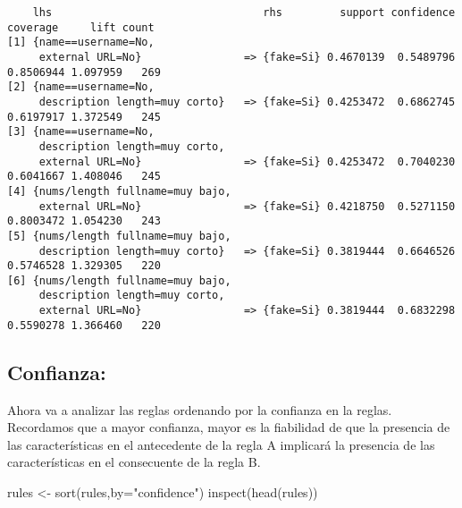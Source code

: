 \documentclass[
  letterpaper,
  DIV=11,
  numbers=noendperiod]{scrreprt}
\newenvironment{Shaded}{\begin{snugshade}}{\end{snugshade}}
\newcommand{\AttributeTok}[1]{\textcolor[rgb]{0.40,0.45,0.13}{#1}}
\newcommand{\FunctionTok}[1]{\textcolor[rgb]{0.28,0.35,0.67}{#1}}
\newcommand{\NormalTok}[1]{\textcolor[rgb]{0.00,0.23,0.31}{#1}}
\newcommand{\OtherTok}[1]{\textcolor[rgb]{0.00,0.23,0.31}{#1}}
\newcommand{\StringTok}[1]{\textcolor[rgb]{0.13,0.47,0.30}{#1}}
\begin{document}
\begin{verbatim}
    lhs                                 rhs         support confidence  coverage     lift count
[1] {name==username=No,                                                                        
     external URL=No}                => {fake=Si} 0.4670139  0.5489796 0.8506944 1.097959   269
[2] {name==username=No,                                                                        
     description length=muy corto}   => {fake=Si} 0.4253472  0.6862745 0.6197917 1.372549   245
[3] {name==username=No,                                                                        
     description length=muy corto,                                                             
     external URL=No}                => {fake=Si} 0.4253472  0.7040230 0.6041667 1.408046   245
[4] {nums/length fullname=muy bajo,                                                            
     external URL=No}                => {fake=Si} 0.4218750  0.5271150 0.8003472 1.054230   243
[5] {nums/length fullname=muy bajo,                                                            
     description length=muy corto}   => {fake=Si} 0.3819444  0.6646526 0.5746528 1.329305   220
[6] {nums/length fullname=muy bajo,                                                            
     description length=muy corto,                                                             
     external URL=No}                => {fake=Si} 0.3819444  0.6832298 0.5590278 1.366460   220
\end{verbatim}

\subsection{Confianza:}\label{confianza}

Ahora va a analizar las reglas ordenando por la confianza en la reglas.
Recordamos que a mayor confianza, mayor es la fiabilidad de que la
presencia de las características en el antecedente de la regla A
implicará la presencia de las características en el consecuente de la
regla B.

\begin{Shaded}
\begin{Highlighting}[]
\NormalTok{rules }\OtherTok{\textless{}{-}} \FunctionTok{sort}\NormalTok{(rules,}\AttributeTok{by=}\StringTok{"confidence"}\NormalTok{)}
\FunctionTok{inspect}\NormalTok{(}\FunctionTok{head}\NormalTok{(rules)) }
\end{Highlighting}
\end{Shaded}
\end{document}
